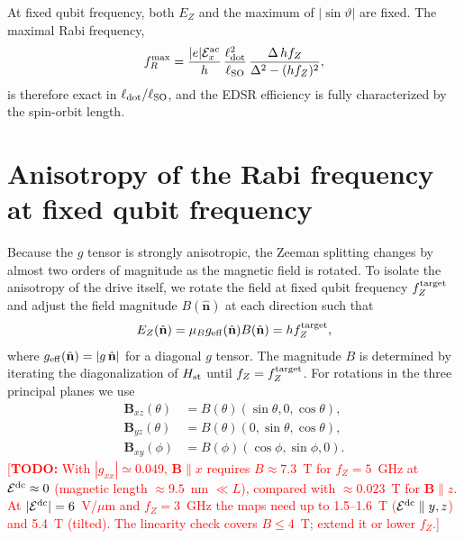 \documentclass[
  aps,
  reprint,
  amsmath,
  amssymb,
  groupedaddress,
  floatfix,
  longbibliography,
]{revtex4-2}
\newcommand{\todo}[1]{\textcolor{red}{[\textbf{TODO:} #1]}}
\newcommand{\Eac}{\mathcal{E}^{\rm ac}_x}
\newcommand{\Edc}{\mathcal{E}^{\rm dc}}
\newcommand{\ldot}{\ell_{\rm dot}}
\newcommand{\lso}{\ell_{\rm SO}}
\newcommand{\nhat}{\hat{\mathbf n}}
\begin{document}
At fixed qubit frequency, both $E_Z$ and the maximum of $|\sin\vartheta|$ are fixed. The maximal Rabi frequency,
\begin{align}
f_R^{\max}
=
\frac{|e|\Eac}{h}\,\frac{\ldot^2}{\lso}\,\frac{\Delta\,hf_Z}{\Delta^2-(hf_Z)^2},
\label{eq:fRmax}
\end{align}
is therefore exact in $\ldot/\lso$, and the EDSR efficiency is fully characterized by the spin-orbit length.


\section{Anisotropy of the Rabi frequency at fixed qubit frequency}
\label{sec:rabi_modulation}


Because the $g$ tensor is strongly anisotropic, the Zeeman splitting changes by almost two orders of magnitude as the magnetic field is rotated. To isolate the anisotropy of the drive itself, we rotate the field at fixed qubit frequency $f_Z^{\rm target}$ and adjust the field magnitude $B(\nhat)$ at each direction such that
\begin{align}
E_Z(\nhat)
=
\mu_B g_{\rm eff}(\nhat)B(\nhat)
=
h f_Z^{\rm target},
\label{eq:fixed_zeeman}
\end{align}
where $g_{\rm eff}(\nhat)=|g\,\nhat|$ for a diagonal $g$ tensor. The magnitude $B$ is determined by iterating the diagonalization of $H_{\rm st}$ until $f_Z=f_Z^{\rm target}$. For rotations in the three principal planes we use
\begin{align}
\mathbf{B}_{xz}(\theta)
&=
B(\theta)
\left(
\sin\theta,0,\cos\theta
\right),
\\
\mathbf{B}_{yz}(\theta)
&=
B(\theta)
\left(
0,\sin\theta,\cos\theta
\right),
\\
\mathbf{B}_{xy}(\phi)
&=
B(\phi)
\left(
\cos\phi,\sin\phi,0
\right).
\end{align}
\todo{With $|g_{xx}|\simeq0.049$, $\mathbf{B}\parallel x$ requires $B\approx7.3$~T for $f_Z=5$~GHz at $\Edc\approx0$ (magnetic length $\approx9.5$~nm $\ll L$), compared with $\approx0.023$~T for $\mathbf{B}\parallel z$. At $|\Edc|=6$~V/$\mu$m and $f_Z=3$~GHz the maps need up to 1.5--1.6~T ($\Edc\parallel y,z$) and 5.4~T (tilted). The linearity check covers $B\le4$~T; extend it or lower $f_Z$.}
\end{document}
